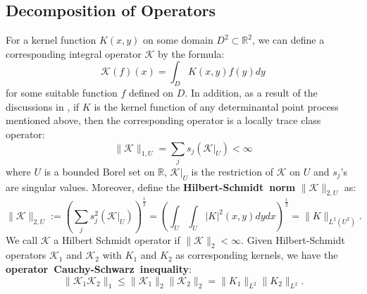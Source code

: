 \documentclass[11pt]{article}
\numberwithin{equation}{section}%
\numberwithin{theorem}{section}
\begin{document}
\subsection{Decomposition of Operators}
For a kernel function $K(x,y)$ on some domain $D^2\subset\mathbb{R}^2$, we can define a corresponding integral operator $\mathcal{K}$ by the formula:
\begin{equation*}
    \mathcal{K}(f)(x)=\int_D K(x,y)f(y)dy
\end{equation*}
for some suitable function $f$ defined on $D$. In addition, as a result of the discussions in \cite{soshnikov2000determinantal}, if $K$ is the kernel function of any determinantal point process mentioned above, then the corresponding operator is a locally trace class operator:
\begin{equation*}
    \|\mathcal{K}\|_{1,U}=\sum_{j}s_j(\mathcal{K}|_U)<\infty
\end{equation*}
where $U$ is a bounded Borel set on $\mathbb{R}$, $\mathcal{K}|_U$ is the restriction of $\mathcal{K}$ on $U$ and $s_j$'s are singular values. Moreover, define the \textbf{Hilbert-Schmidt~norm} $\|\mathcal{K}\|_{2,U}$ as:
\begin{equation}\label{2 to L^2}
    \|\mathcal{K}\|_{2,U}:=\left(\sum_{j}s_j^2(\mathcal{K}|_U)\right)^{\frac{1}{2}}=\left(\int_U\int_U |K|^2(x,y)dydx\right)^{\frac{1}{2}}=\|K\|_{L^2(U^2)}.
\end{equation}
We call $\mathcal{K}$ a Hilbert Schmidt operator if $\|\mathcal{K}\|_2<\infty$. Given Hilbert-Schmidt operators $\mathcal{K}_1$ and $\mathcal{K}_2$ with $K_1$ and $K_2$ as corresponding kernels, we have the \textbf{operator~Cauchy-Schwarz~inequality}:
\begin{equation}\label{CS in}
\|\mathcal{K}_1\mathcal{K}_2\|_1\le\|\mathcal{K}_1\|_2\|\mathcal{K}_2\|_2=\|K_1\|_{L^2}\|K_2\|_{L^2}.
\end{equation}
\end{document}
